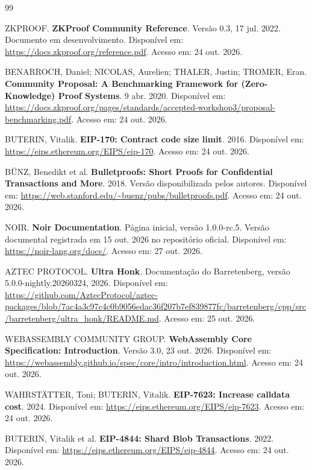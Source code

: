 \begingroup
\renewcommand{\baselinestretch}{1}\normalsize
\begin{thebibliography}{99}
\raggedright
\setlength{\itemsep}{\baselineskip}
\setlength{\parsep}{0pt}
ZKPROOF. \textbf{ZKProof Community Reference}. Versão 0.3, 17 jul. 2022. Documento em desenvolvimento. Disponível em: \url{https://docs.zkproof.org/reference.pdf}. Acesso em: 24 out. 2026.

BENARROCH, Daniel; NICOLAS, Aurelien; THALER, Justin; TROMER, Eran. \textbf{Community Proposal: A Benchmarking Framework for (Zero-Knowledge) Proof Systems}. 9 abr. 2020. Disponível em: \url{https://docs.zkproof.org/pages/standards/accepted-workshop3/proposal-benchmarking.pdf}. Acesso em: 24 out. 2026.

BUTERIN, Vitalik. \textbf{EIP-170: Contract code size limit}. 2016. Disponível em: \url{https://eips.ethereum.org/EIPS/eip-170}. Acesso em: 24 out. 2026.

BÜNZ, Benedikt et al. \textbf{Bulletproofs: Short Proofs for Confidential Transactions and More}. 2018. Versão disponibilizada pelos autores. Disponível em: \url{https://web.stanford.edu/~buenz/pubs/bulletproofs.pdf}. Acesso em: 24 out. 2026.

NOIR. \textbf{Noir Documentation}. Página inicial, versão 1.0.0-rc.5. Versão documental registrada em 15 out. 2026 no repositório oficial. Disponível em: \url{https://noir-lang.org/docs/}. Acesso em: 27 out. 2026.

AZTEC PROTOCOL. \textbf{Ultra Honk}. Documentação do Barretenberg, versão 5.0.0-nightly.20260324, 2026. Disponível em: \url{https://github.com/AztecProtocol/aztec-packages/blob/7ac4a3c97c4c0b9056edac36f207b7ef839877fc/barretenberg/cpp/src/barretenberg/ultra_honk/README.md}. Acesso em: 25 out. 2026.

WEBASSEMBLY COMMUNITY GROUP. \textbf{WebAssembly Core Specification: Introduction}. Versão 3.0, 23 out. 2026. Disponível em: \url{https://webassembly.github.io/spec/core/intro/introduction.html}. Acesso em: 24 out. 2026.

WAHRSTÄTTER, Toni; BUTERIN, Vitalik. \textbf{EIP-7623: Increase calldata cost}. 2024. Disponível em: \url{https://eips.ethereum.org/EIPS/eip-7623}. Acesso em: 24 out. 2026.

BUTERIN, Vitalik et al. \textbf{EIP-4844: Shard Blob Transactions}. 2022. Disponível em: \url{https://eips.ethereum.org/EIPS/eip-4844}. Acesso em: 24 out. 2026.


\end{thebibliography}
